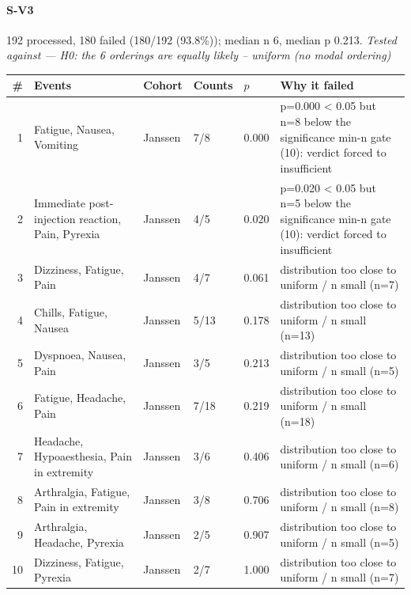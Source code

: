 \documentclass[11pt]{article}
\begin{document}
\paragraph{S-V3} 192 processed, 180 failed (180/192 (93.8\%)); median n 6, median p 0.213. \emph{Tested against --- H0: the 6 orderings are equally likely -- uniform (no modal ordering)} \\
\begin{longtable}{@{}r p{3.9cm} p{2.5cm} l l p{4.4cm}@{}}
\toprule
\# & Events & Cohort & Counts & $p$ & Why it failed \\
\midrule \endhead
1 & Fatigue, Nausea, Vomiting & Janssen & 7/8 & 0.000 & p=0.000 < 0.05 but n=8 below the significance min-n gate (10): verdict forced to insufficient \\
2 & Immediate post-injection reaction, Pain, Pyrexia & Janssen & 4/5 & 0.020 & p=0.020 < 0.05 but n=5 below the significance min-n gate (10): verdict forced to insufficient \\
3 & Dizziness, Fatigue, Pain & Janssen & 4/7 & 0.061 & distribution too close to uniform / n small (n=7) \\
4 & Chills, Fatigue, Nausea & Janssen & 5/13 & 0.178 & distribution too close to uniform / n small (n=13) \\
5 & Dyspnoea, Nausea, Pain & Janssen & 3/5 & 0.213 & distribution too close to uniform / n small (n=5) \\
6 & Fatigue, Headache, Pain & Janssen & 7/18 & 0.219 & distribution too close to uniform / n small (n=18) \\
7 & Headache, Hypoaesthesia, Pain in extremity & Janssen & 3/6 & 0.406 & distribution too close to uniform / n small (n=6) \\
8 & Arthralgia, Fatigue, Pain in extremity & Janssen & 3/8 & 0.706 & distribution too close to uniform / n small (n=8) \\
9 & Arthralgia, Headache, Pyrexia & Janssen & 2/5 & 0.907 & distribution too close to uniform / n small (n=5) \\
10 & Dizziness, Fatigue, Pyrexia & Janssen & 2/7 & 1.000 & distribution too close to uniform / n small (n=7) \\
\bottomrule
\end{longtable}
\end{document}

